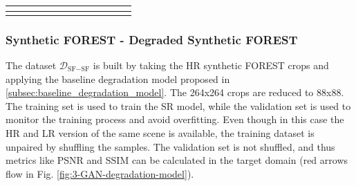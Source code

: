 \begin{table}[H]
{\begin{tabular}{c|cccc|cccc|cccc}
                & \multicolumn{1}{c|}{}                                                        & \multicolumn{1}{c|}{}                                                                  &                                                        &                                                                   &                                                        & \multicolumn{1}{c|}{}                                                        &                                                        &                                                         &                                                        & \multicolumn{1}{c|}{}                                                        &                                                        & \multicolumn{1}{c|}{}                                                        \\ \hline
                & \multicolumn{1}{c|}{}                                                        & \multicolumn{1}{c|}{}                                                                  &                                                        &                                                                   &                                                        & \multicolumn{1}{c|}{}                                                        &                                                        &                                                         &                                                        & \multicolumn{1}{c|}{}                                                        &                                                        & \multicolumn{1}{c|}{}                                                       
    \end{tabular}%
    }
    \caption{}
    \label{tab:my-table}
    \end{table}


\subsubsection{Synthetic FOREST - Degraded Synthetic FOREST}
    The dataset $\mathcal{D}_{\text{SF}-\text{SF}}$ is built by taking the HR synthetic FOREST crops and applying the baseline degradation model proposed in \ref{subsec:baseline_degradation_model}. 
    The 264x264 crops are reduced to 88x88. The training set is used to train the SR model, while the validation set is used to monitor the training process and avoid overfitting. 
    Even though in this case the HR and LR version of the same scene is available, the training dataset is unpaired by shuffling the samples.
    The validation set is not shuffled, and thus metrics like PSNR and SSIM can be calculated in the target domain (red arrows flow in Fig. \ref{fig:3-GAN-degradation-model}). 

